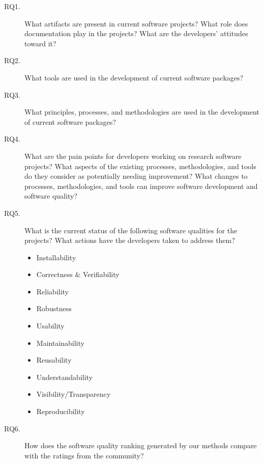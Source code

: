 \begin{description}
\item[RQ1.] What artifacts are present in current software projects? What role does documentation play in the projects? What are the developers' attitudes toward it?
\item[RQ2.] What tools are used in the development of current software packages?
\item[RQ3.] What principles, processes, and methodologies are used in the development of current software packages?
\item[RQ4.] What are the pain points for developers working on research software projects? What aspects of the existing processes, methodologies, and tools do they consider as potentially needing improvement? What changes to processes, methodologies, and tools can improve software development and software quality?
\item[RQ5.] What is the current status of the following software qualities for the projects? What actions have the developers taken to address them?
\begin{itemize}
	\item Installability
	\item Correctness \& Verifiability
	\item Reliability
	\item Robustness
	\item Usability
	\item Maintainability
	\item Reusability
	\item Understandability
	\item Visibility/Transparency
	\item Reproducibility
\end{itemize}
\item[RQ6.] How does the software quality ranking generated by our methods compare with the ratings from the community?
\end{description}

